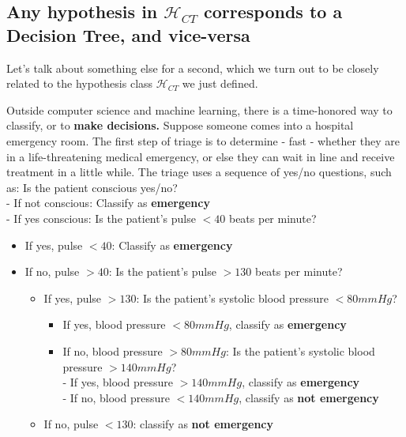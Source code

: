 \documentclass[11pt]{article}
\newcommand{\Hc}{\mathcal{H}}
\begin{document}
\begin{itemize}
     \subsection{Any hypothesis in $\Hc_{CT}$ corresponds to a Decision Tree,
     and vice-versa}
    
     Let's talk about something else for a second, which we turn out to be
     closely related to the hypothesis class $\Hc_{CT}$ we just defined.

     Outside computer science and machine learning, there is a time-honored way
     to classify, or to {\bf make decisions.} Suppose someone comes into a
     hospital emergency room. The first step of triage is to determine - fast - whether
     they are in a life-threatening medical emergency, or else they can wait in
     line and receive treatment in a little while. The triage uses a sequence of
     yes/no questions, such as: 
       Is the patient conscious yes/no? \\
	   - If not conscious: Classify as {\bf emergency}\\
	   - If yes conscious: Is the patient's pulse $<40$ beats per
	     minute?
	     \begin{itemize}
	       \item If yes, pulse $<40$: Classify as {\bf emergency} 
	       \item If no, pulse $>40$: Is the patient's pulse $>130$ beats per
		 minute?
		\begin{itemize}
	       \item If yes, pulse $>130$: Is the patient's systolic blood
		 pressure $<80 mm Hg$?
		 \begin{itemize}
		   \item If yes, blood pressure $<80 mm Hg$,  classify as {\bf
		     emergency} 
		   \item If no, blood pressure $>80 mm Hg$: Is the patient's systolic blood
		 pressure $>140 mm Hg$?\\
		 - If yes, blood pressure $>140 mm Hg$, classify as {\bf
		     emergency} \\
		 - If no, blood pressure $<140 mm Hg$, classify as {\bf
		     not emergency} 
	     \end{itemize}

	       \item If no, pulse $<130$: classify as {\bf not emergency}
	     \end{itemize}
	     \end{itemize}
 \end{itemize}
\end{document}
